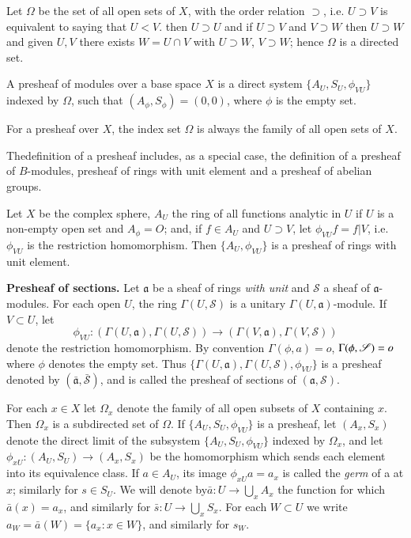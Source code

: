 \medskip
{}

Let $\Omega$ be the set of all open sets of $X$, with the order
relation $\supset$, i.e. $U \supset V$ is equivalent to saying that
$U < V$. then $U \supset U$ and if $U \supset V$ and  $V \supset W$
then $U \supset W$ and given $U, V$ there exists $W = U \cap V$ with
$U \supset W$, $V \supset W$; hence $\Omega$ is a directed set. 

\begin{defi*}
A presheaf of modules over a base space $X$ is a direct system
$\{A_U, S_U, \phi_{VU} \}$ indexed by $\Omega$, such that $(A_\phi, S_\phi) =
(0, 0)$, where $\phi$ is the empty set. 
\end{defi*}

For a presheaf over $X$, the index set $\Omega$ is always the family
of all open sets of $X$. 

The\pageoriginale definition of a presheaf includes, as a special case, the
definition of a presheaf of $B$-modules, presheaf of rings with unit
element and a presheaf of abelian groups. 

\setcounter{exam}{9}
\begin{exam}\label{chap6:exam10}%
Let $X$ be the complex sphere, $A_U$ the ring of all functions
analytic in $U$ if $U$ is a non-empty open set and $A_\phi = O$; and,
if $f \in A_U$ and $U \supset V$, let $\phi_{VU} f = f  | V$,
i.e. $\phi_{VU}$ is the restriction homomorphism. Then $\{A_U,
\phi_{VU}\}$ is a presheaf of rings with unit element. 
\end{exam}


\noindent
\medskip
{\bf Presheaf of sections.} Let $\mathfrak{a}$ be a sheaf of rings \textit{with
  unit} and $\mathscr{S}$ a sheaf of $\mathfrak{a}$-modules. For each
open $U$, the ring $\Gamma (U, \mathscr{S})$ is a unitary $\Gamma (U,
\mathfrak{a})$-module. If $V \subset U$, let 
$$
\phi_{VU}: (\Gamma (U, \mathfrak{a}), \Gamma (U, \mathscr{S})) \to
(\Gamma (V, \mathfrak{a}), \Gamma (V, \mathscr{S})) 
$$
denote the restriction homomorphism. By convention $\Gamma(\phi,
a)=o$,  $\Gamma\break (\phi, \mathscr{S})= o$ where $\phi$ denotes the empty
set. Thus $\{\Gamma (U, \mathfrak{a}), \Gamma (U, \mathscr{S}),
\phi_{VU}\}$ is a presheaf denoted by $(\bar{\mathfrak{a}}, \bar{\mathscr{S}})$,
and is called the presheaf of sections of $(\mathfrak{a},\mathscr{S})$.  

For each $x \in X$ let $\Omega_x$ denote the family of all
open subsets of $X$ containing $x$. Then $\Omega_x$ is a subdirected
set of $\Omega$. If $\{A_U, S_U, \phi_{VU}\}$ is a presheaf, let
$(A_x, S_x)$ denote the direct limit of the subsystem \break $\{A_U, S_U,
\phi_{VU}\}$ indexed by $\Omega_x$, and let $\phi_{xU} : (A_U, S_U)
\to (A_x, S_x)$ be the homomorphism which sends each element into its
equivalence class. If $a \in A_U$, its image $\phi_{xU}a = a_x$ is
called the \textit{germ} of a at $x$; similarly for $s \in S_U$. We
will denote by\pageoriginale $\bar{a}: U \to \bigcup\limits_x A_x$ the
function for 
which $\bar{a}(x) = a_x$, and similarly for $\bar{s}: U \to \bigcup
\limits_x S_x$. For each $W \subset U$ we write $a_W = \bar{a} (W)=
\{a_x : x \in W \}$, and similarly for $s_W$. 

